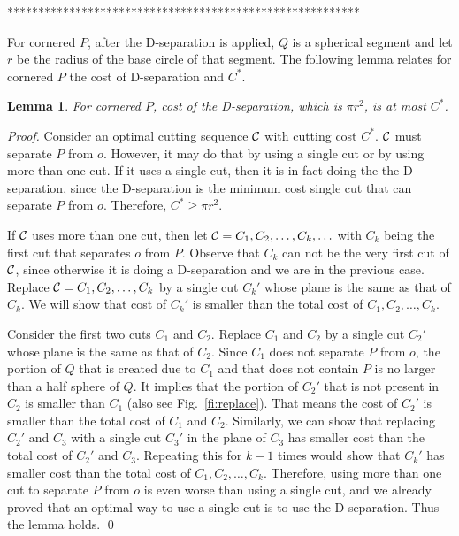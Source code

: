 \documentclass{llncs}
\newtheorem{lem}{Lemma}
\begin{document}
*********************************************************\fi


For cornered $P$, after the D-separation is applied, $Q$ is a spherical segment
and let $r$ be the radius of the base circle of that segment.
The following lemma relates for cornered $P$ the cost of D-separation and $C^*$.

\begin{lem}
\label{le:cornered_lb}
For cornered $P$, cost of the D-separation, which is $\pi r^2$, is at most $C^*$.
\end{lem}

\begin{proof}
Consider an optimal cutting sequence ${\cal C}$ with cutting cost $C^*$. 
${\cal C}$ must separate $P$ from $o$. 
However, it may do that by using a single cut  or by using more than one cut. 
If it uses a single cut, then it is in fact doing the the D-separation, 
since the D-separation is the minimum cost single cut that can separate $P$ from $o$.
Therefore, $C^*\ge \pi r^2$.

If ${\cal C}$ uses more than one cut, then let ${\cal C}=C_1,C_2,\ldots,C_k,\ldots$ 
with $C_k$ being the first cut that separates $o$ from $P$. 
Observe that $C_k$ can not be the very first cut of ${\cal C}$, 
since otherwise it is doing a D-separation and we are in the previous case.
Replace ${\cal C}=C_1,C_2,\ldots,C_k$ by a single cut ${C_k}'$ whose plane is the same as that of $C_k$.
We will show that cost of ${C_k}'$ is smaller than the total cost of $C_1,C_2,\ldots,C_{k}$.

Consider the first two cuts $C_1$ and $C_2$.
Replace $C_1$ and $C_2$ by a single cut ${C_2}'$ whose plane is the same as that of $C_2$.
Since $C_1$ does not separate $P$ from $o$, the portion of $Q$ that is created due to $C_1$
and that does not contain $P$ is no larger than a half sphere of $Q$.
It implies that the portion of ${C_2}'$ that is not present in $C_2$ is smaller than $C_1$
(also see Fig.~\ref{fi:replace}).
That means the cost of ${C_2}'$ is smaller than the total cost of $C_1$ and $C_2$.
Similarly, we can show that replacing ${C_2}'$ and $C_3$ with a 
single cut ${C_3}'$ in the plane of $C_3$ has smaller cost than the total cost of ${C_2}'$ and $C_3$.
Repeating this for $k-1$ times would show that ${C_k}'$ has smaller cost than the total cost of $C_1,C_2,\ldots,C_{k}$.
Therefore, using more than one cut to separate $P$ from $o$ is even worse than using a single cut,
and we already proved that an optimal way to use a single cut is to use the D-separation.
Thus the lemma holds.
\qed
\end{proof}
\end{document}
